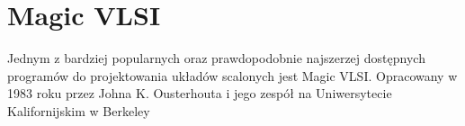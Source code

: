 \section{Magic VLSI}

Jednym z bardziej popularnych oraz prawdopodobnie najszerzej dostępnych programów do projektowania układów scalonych
jest Magic VLSI\@.
Opracowany w 1983 roku przez Johna K. Ousterhouta i jego zespół na Uniwersytecie Kalifornijskim w Berkeley~\cite{MAGIC_article} 
